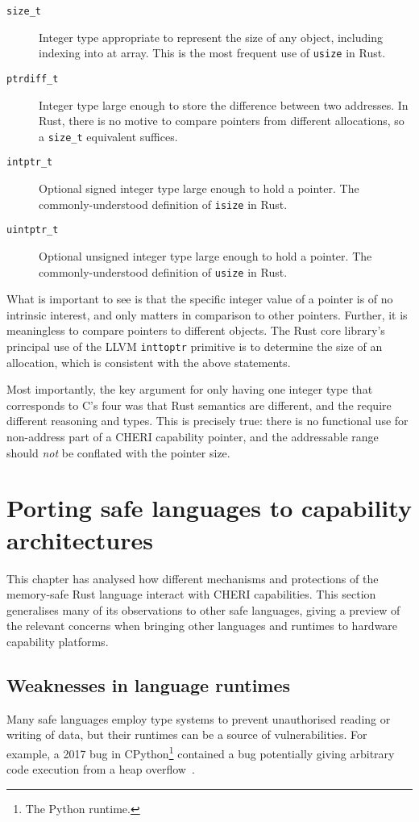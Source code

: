 \documentclass[dissertation.tex]{subfiles}
\begin{document}
\begin{description}
    \item[\texttt{size\_t}] Integer type appropriate to represent the
    size of any object, including indexing into at array.
    This is the most frequent use of \texttt{usize} in Rust.
    \item[\texttt{ptrdiff\_t}] Integer type large enough to store the
    difference between two addresses. In Rust, there is no motive to
    compare pointers from different allocations, so a \texttt{size\_t}
    equivalent suffices.
    \item[\texttt{intptr\_t}] Optional signed integer type large enough to hold
    a pointer. The commonly-understood definition of \texttt{isize} in Rust.
    \item[\texttt{uintptr\_t}] Optional unsigned integer type large enough to hold
    a pointer. The commonly-understood definition of \texttt{usize} in Rust.
\end{description}

What is important to see is that the specific integer value of a pointer
is of no intrinsic interest, and only matters in comparison to other
pointers.
Further, it is meaningless to compare pointers to different objects.
The Rust core library's principal use of the LLVM \texttt{inttoptr}
primitive is to determine the size of an allocation, which is consistent
with the above statements.

Most importantly, the key argument for only having one integer type that
corresponds to C's four was that Rust semantics are different, and the
require different reasoning and types.
This is precisely true: there is no functional use for non-address part
of a CHERI capability pointer, and the addressable range should
\emph{not} be conflated with the pointer size.


\section{Porting safe languages to capability architectures}
\label{sec:eval-porting}

This chapter has analysed how different mechanisms and protections of
the memory-safe Rust language interact with CHERI capabilities.
This section generalises many of its observations to other safe
languages, giving a preview of the relevant concerns when bringing other
languages and runtimes to hardware capability platforms.


\subsection{Weaknesses in language runtimes}
Many safe languages employ type systems to prevent unauthorised reading
or writing of data, but their runtimes can be a source of
vulnerabilities.
For example, a 2017 bug in CPython\footnote{The Python runtime.}
contained a bug potentially giving arbitrary code execution from a heap
overflow~\cite{cpython-overflow}.
\end{document}
